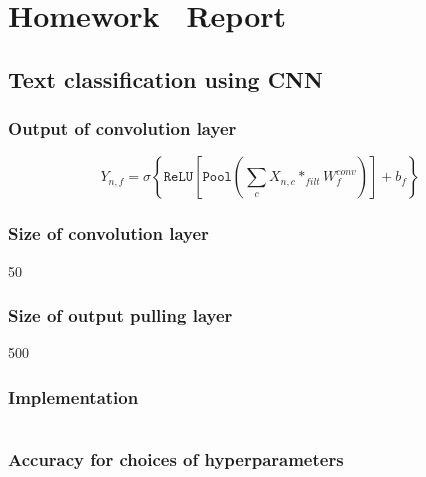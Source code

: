 \documentclass[12pt]{article}
\begin{document}
\section{Homework \thesection\ Report}
\subsection{Text classification using CNN}
\subsubsection{Output of convolution layer}
\[ Y_{n,f}= \sigma\left\{\texttt{ReLU}\left[\texttt{Pool}\left(\sum_{c}X_{n,c}*_{filt}W_{f}^{conv}\right) \right] + b_f \right\} \]
\subsubsection{Size of convolution layer}
50
\subsubsection{Size of output pulling layer}
500
\subsubsection{Implementation}
\inputminted[frame=single,framesep=10pt,linenos, breaklines,xleftmargin=\parindent,xrightmargin=\parindent]{python}{./Homework3/code/cnn.py}
\subsubsection{Accuracy for choices of hyperparameters}
\end{document}
